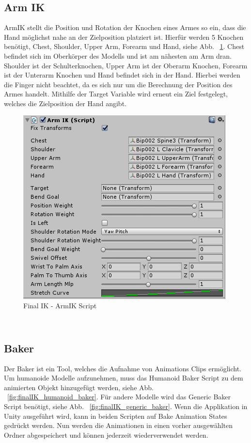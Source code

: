 \subsection{Arm IK}\label{subsec:arm-ik}
ArmIK stellt die Position und Rotation der Knochen eines Armes so ein, dass die Hand möglichst nahe an der Zielposition platziert ist.
Hierfür werden 5 Knochen benötigt, Chest, Shoulder, Upper Arm, Forearm und Hand, siehe Abb. ~\ref{fig:finalIK_armIK_script}.
Chest befindet sich im Oberkörper des Modells und ist am nähesten am Arm dran.
Shoulder ist der Schulterknochen, Upper Arm ist der Oberarm Knochen, Forearm ist der Unterarm Knochen und Hand befindet sich in der Hand.
Hierbei werden die Finger nicht beachtet, da es sich nur um die Berechnung der Position des Armes handelt.
Mithilfe der Target Variable wird erneut ein Ziel festgelegt, welches die Zielposition der Hand angibt.
\begin {figure}
    \centering
    \includegraphics[scale=1]{pics/finalik_armik_script}
    \caption{Final IK - ArmIK Script}
    \label{fig:finalIK_armIK_script}
\end {figure}
~\cite{FinalIK_ArmIK_2021}

\subsection{Baker}\label{subsec:baker}
Der Baker ist ein Tool, welches die Aufnahme von Animations Clips ermöglicht.
Um humanoide Modelle aufzunehmen, muss das Humanoid Baker Script zu dem animierten Objekt hinzugefügt werden, siehe Abb. ~\ref{fig:finalIK_humanoid_baker}.
Für andere Modelle wird das Generic Baker Script benötigt, siehe Abb. ~\ref{fig:finalIK_generic_baker}.
Wenn die Applikation in Unity ausgeführt wird, kann in beiden Scripten auf Bake Animation States gedrückt werden.
Nun werden die Animationen in einen vorher ausgewählten Ordner abgespeichert und können jederzeit wiederverwendet werden.

